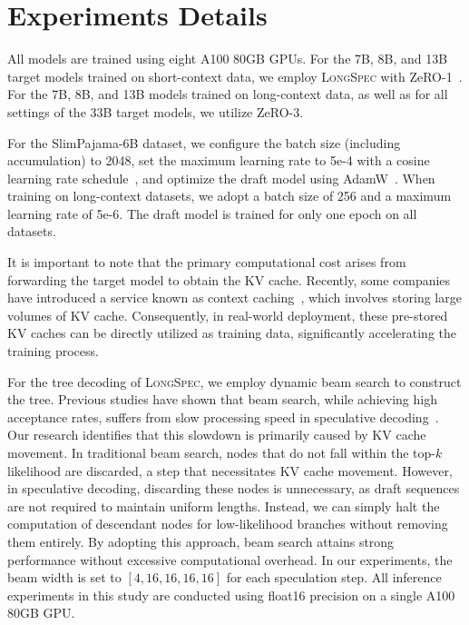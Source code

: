 \section{Experiments Details}
\label{appendix:training_details}

All models are trained using eight A100 80GB GPUs. For the 7B, 8B, and 13B target models trained on short-context data, we employ \textsc{LongSpec} with ZeRO-1~\cite{rasley2020deepspeed}. For the 7B, 8B, and 13B models trained on long-context data, as well as for all settings of the 33B target models, we utilize ZeRO-3.  

For the SlimPajama-6B dataset, we configure the batch size (including accumulation) to 2048, set the maximum learning rate to 5e-4 with a cosine learning rate schedule~\cite{loshchilov2017sgdr}, and optimize the draft model using AdamW~\cite{kingma2015adam}. When training on long-context datasets, we adopt a batch size of 256 and a maximum learning rate of 5e-6. The draft model is trained for only one epoch on all datasets.

It is important to note that the primary computational cost arises from forwarding the target model to obtain the KV cache. Recently, some companies have introduced a service known as context caching~\cite{deepseek2024contextcaching, gemini2024contextcaching}, which involves storing large volumes of KV cache. Consequently, in real-world deployment, these pre-stored KV caches can be directly utilized as training data, significantly accelerating the training process.  

For the tree decoding of \textsc{LongSpec}, we employ dynamic beam search to construct the tree. Previous studies have shown that beam search, while achieving high acceptance rates, suffers from slow processing speed in speculative decoding~\cite{du2024glide}. Our research identifies that this slowdown is primarily caused by KV cache movement. In traditional beam search, nodes that do not fall within the top-$k$ likelihood are discarded, a step that necessitates KV cache movement. However, in speculative decoding, discarding these nodes is unnecessary, as draft sequences are not required to maintain uniform lengths. Instead, we can simply halt the computation of descendant nodes for low-likelihood branches without removing them entirely. By adopting this approach, beam search attains strong performance without excessive computational overhead. In our experiments, the beam width is set to $[4, 16, 16, 16, 16]$ for each speculation step. All inference experiments in this study are conducted using float16 precision on a single A100 80GB GPU.  